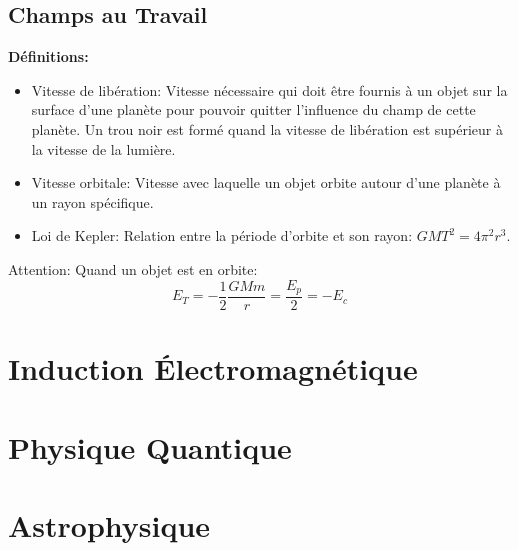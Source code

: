 \documentclass[french, a4paper, 12pt]{article}
\begin{document}
\subsection{Champs au Travail}
\textbf{Définitions:}
\begin{itemize}
\item Vitesse de libération: Vitesse nécessaire qui doit être fournis à un objet sur la surface d'une planète pour pouvoir quitter l'influence du champ de cette planète. Un trou noir est formé quand la vitesse de libération est supérieur à la vitesse de la lumière.
\item Vitesse orbitale: Vitesse avec laquelle un objet orbite autour d'une planète à un rayon spécifique.
\item Loi de Kepler: Relation entre la période d'orbite et son rayon: $GMT^2=4\pi ^2r^3$.
\end{itemize}
Attention: Quand un objet est en orbite: \[E_T=-\frac{1}{2} \frac{GMm}{r}=\frac{E_p}{2}=-E_c\]
\pagebreak

\section{Induction Électromagnétique}
\pagebreak

\section{Physique Quantique}
\pagebreak

\section{Astrophysique}
\end{document}
